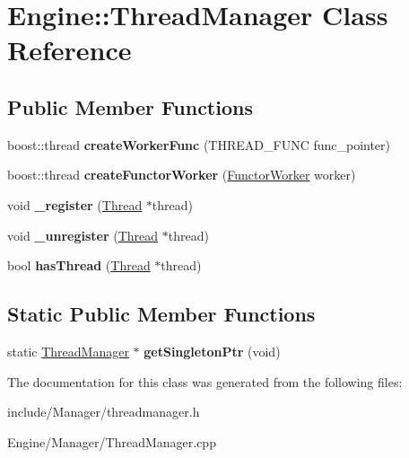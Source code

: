 \hypertarget{classEngine_1_1ThreadManager}{}\section{Engine\+:\+:Thread\+Manager Class Reference}
\label{classEngine_1_1ThreadManager}
\subsection*{Public Member Functions}
\begin{DoxyCompactItemize}
\item 
\hypertarget{classEngine_1_1ThreadManager_ae503f37215db398064281b604ce43aab}{}boost\+::thread {\bfseries create\+Worker\+Func} (T\+H\+R\+E\+A\+D\+\_\+\+F\+U\+N\+C func\+\_\+pointer)\label{classEngine_1_1ThreadManager_ae503f37215db398064281b604ce43aab}

\item 
\hypertarget{classEngine_1_1ThreadManager_a40d2c475153604493c81f94edc94a109}{}boost\+::thread {\bfseries create\+Functor\+Worker} (\hyperlink{classEngine_1_1FunctorWorker}{Functor\+Worker} worker)\label{classEngine_1_1ThreadManager_a40d2c475153604493c81f94edc94a109}

\item 
\hypertarget{classEngine_1_1ThreadManager_a8c75358dbf2fb3242ca74d2c706638c8}{}void {\bfseries \+\_\+register} (\hyperlink{classEngine_1_1Thread}{Thread} $\ast$thread)\label{classEngine_1_1ThreadManager_a8c75358dbf2fb3242ca74d2c706638c8}

\item 
\hypertarget{classEngine_1_1ThreadManager_af52de623cab62faf5760e9b3b0c0ccde}{}void {\bfseries \+\_\+unregister} (\hyperlink{classEngine_1_1Thread}{Thread} $\ast$thread)\label{classEngine_1_1ThreadManager_af52de623cab62faf5760e9b3b0c0ccde}

\item 
\hypertarget{classEngine_1_1ThreadManager_acfcf9e510978a879b9349535abc8fd55}{}bool {\bfseries has\+Thread} (\hyperlink{classEngine_1_1Thread}{Thread} $\ast$thread)\label{classEngine_1_1ThreadManager_acfcf9e510978a879b9349535abc8fd55}

\end{DoxyCompactItemize}
\subsection*{Static Public Member Functions}
\begin{DoxyCompactItemize}
\item 
\hypertarget{classEngine_1_1ThreadManager_a7892645ae56d0689328aaa2998779d70}{}static \hyperlink{classEngine_1_1ThreadManager}{Thread\+Manager} $\ast$ {\bfseries get\+Singleton\+Ptr} (void)\label{classEngine_1_1ThreadManager_a7892645ae56d0689328aaa2998779d70}

\end{DoxyCompactItemize}


The documentation for this class was generated from the following files\+:\begin{DoxyCompactItemize}
\item 
include/\+Manager/threadmanager.\+h\item 
Engine/\+Manager/Thread\+Manager.\+cpp\end{DoxyCompactItemize}
